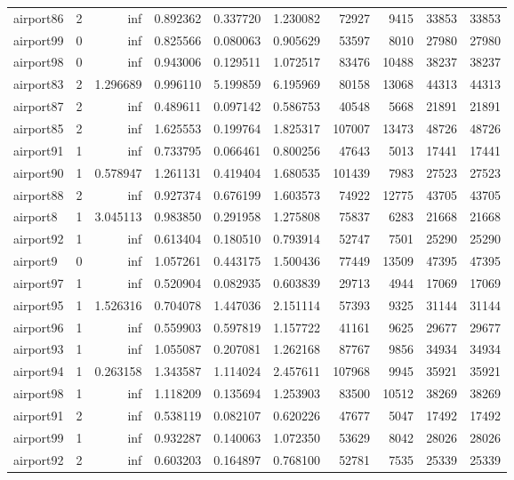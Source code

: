 \begin{longtable}{|l|r|r|r|r|r|r|r|r|r|}
airport86 & 2 & inf & 0.892362 & 0.337720 & 1.230082 & 72927 & 9415 & 33853 & 33853 \\
airport99 & 0 & inf & 0.825566 & 0.080063 & 0.905629 & 53597 & 8010 & 27980 & 27980 \\
airport98 & 0 & inf & 0.943006 & 0.129511 & 1.072517 & 83476 & 10488 & 38237 & 38237 \\
airport83 & 2 & 1.296689 & 0.996110 & 5.199859 & 6.195969 & 80158 & 13068 & 44313 & 44313 \\
airport87 & 2 & inf & 0.489611 & 0.097142 & 0.586753 & 40548 & 5668 & 21891 & 21891 \\
airport85 & 2 & inf & 1.625553 & 0.199764 & 1.825317 & 107007 & 13473 & 48726 & 48726 \\
airport91 & 1 & inf & 0.733795 & 0.066461 & 0.800256 & 47643 & 5013 & 17441 & 17441 \\
airport90 & 1 & 0.578947 & 1.261131 & 0.419404 & 1.680535 & 101439 & 7983 & 27523 & 27523 \\
airport88 & 2 & inf & 0.927374 & 0.676199 & 1.603573 & 74922 & 12775 & 43705 & 43705 \\
airport8 & 1 & 3.045113 & 0.983850 & 0.291958 & 1.275808 & 75837 & 6283 & 21668 & 21668 \\
airport92 & 1 & inf & 0.613404 & 0.180510 & 0.793914 & 52747 & 7501 & 25290 & 25290 \\
airport9 & 0 & inf & 1.057261 & 0.443175 & 1.500436 & 77449 & 13509 & 47395 & 47395 \\
airport97 & 1 & inf & 0.520904 & 0.082935 & 0.603839 & 29713 & 4944 & 17069 & 17069 \\
airport95 & 1 & 1.526316 & 0.704078 & 1.447036 & 2.151114 & 57393 & 9325 & 31144 & 31144 \\
airport96 & 1 & inf & 0.559903 & 0.597819 & 1.157722 & 41161 & 9625 & 29677 & 29677 \\
airport93 & 1 & inf & 1.055087 & 0.207081 & 1.262168 & 87767 & 9856 & 34934 & 34934 \\
airport94 & 1 & 0.263158 & 1.343587 & 1.114024 & 2.457611 & 107968 & 9945 & 35921 & 35921 \\
airport98 & 1 & inf & 1.118209 & 0.135694 & 1.253903 & 83500 & 10512 & 38269 & 38269 \\
airport91 & 2 & inf & 0.538119 & 0.082107 & 0.620226 & 47677 & 5047 & 17492 & 17492 \\
airport99 & 1 & inf & 0.932287 & 0.140063 & 1.072350 & 53629 & 8042 & 28026 & 28026 \\
airport92 & 2 & inf & 0.603203 & 0.164897 & 0.768100 & 52781 & 7535 & 25339 & 25339 \\

\end{longtable}
